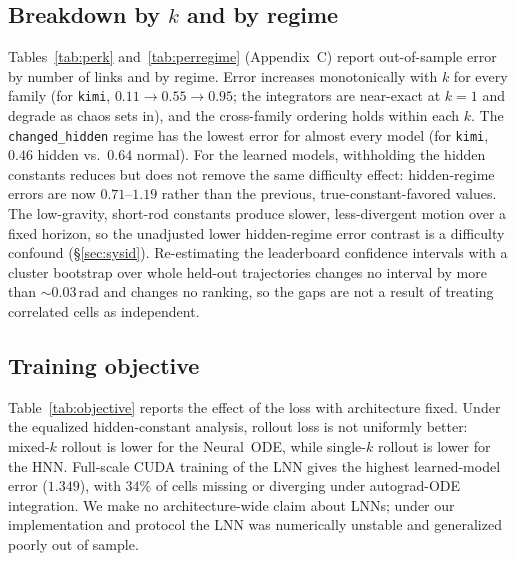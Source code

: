 \documentclass{article}
\begin{document}
\subsection{Breakdown by $k$ and by regime}
\label{sec:breakdown}
Tables~\ref{tab:perk} and~\ref{tab:perregime} (Appendix~C) report out-of-sample error by
number of links and by regime. Error increases monotonically with $k$ for every family (for
\texttt{kimi}, $0.11\to0.55\to0.95$; the integrators are near-exact at $k{=}1$ and degrade as
chaos sets in), and the cross-family ordering holds within each $k$. The
\texttt{changed\_hidden} regime has the lowest error for almost every model (for
\texttt{kimi}, $0.46$ hidden vs.\ $0.64$ normal). For the learned models, withholding the
hidden constants reduces but does not remove the same difficulty effect: hidden-regime errors
are now $0.71$--$1.19$ rather than the previous, true-constant-favored values. The
low-gravity, short-rod constants produce slower, less-divergent motion over a fixed horizon,
so the unadjusted lower hidden-regime error
contrast is a difficulty confound (\S\ref{sec:sysid}). Re-estimating the leaderboard
confidence intervals with a cluster bootstrap over whole held-out trajectories changes no
interval by more than ${\sim}0.03$\,rad and changes no ranking, so the gaps are not a
result of treating correlated cells as independent.

\subsection{Training objective}
\label{sec:objective}
Table~\ref{tab:objective} reports the effect of the loss with architecture fixed. Under the
equalized hidden-constant analysis, rollout loss is not uniformly better: mixed-$k$ rollout
is lower for the Neural~ODE, while single-$k$ rollout is lower for the HNN. Full-scale CUDA
training of the LNN gives the highest learned-model error ($1.349$), with $34\%$ of cells
missing or diverging under autograd-ODE integration. We make no architecture-wide claim about
LNNs; under our implementation and protocol the LNN was numerically unstable and generalized
poorly out of sample.
\end{document}
